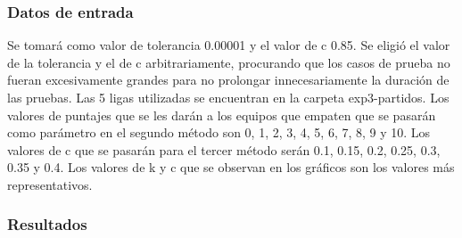             \subsubsection*{Datos de entrada}
            Se tomará como valor de tolerancia 0.00001 y el valor de c 0.85. Se eligió el valor de la tolerancia y el de c arbitrariamente, procurando que los casos de prueba no fueran excesivamente grandes para no prolongar innecesariamente la duración de las pruebas. Las 5 ligas utilizadas se encuentran en la carpeta exp3-partidos. Los valores de puntajes que se les darán a los equipos que empaten que se pasarán como parámetro en el segundo método son 0, 1, 2, 3, 4, 5, 6, 7, 8, 9 y 10. Los valores de c que se pasarán para el tercer método serán 0.1, 0.15, 0.2, 0.25, 0.3, 0.35 y 0.4. Los valores de k y c que se observan en los gráficos son los valores más representativos.

            \subsubsection*{Resultados}

                {\centering \begin{tabular}{c}
                \end{tabular}}
                  {\centering \begin{tabular}{c}
                \end{tabular}}
                  {\centering \begin{tabular}{c}
                \end{tabular}}


